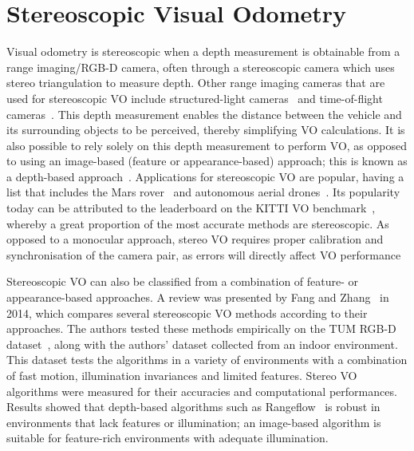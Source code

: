 \section{Stereoscopic Visual Odometry}\label{sec:3:svo}
Visual odometry is stereoscopic when a depth measurement is obtainable from a range imaging/RGB-D camera, often through a stereoscopic camera which uses stereo triangulation to measure depth. Other range imaging cameras that are used for stereoscopic VO include structured-light cameras~\cite{liu_improved_2017,huang_visual_2017} and time-of-flight cameras~\cite{stefan_threedimensional_2009}. This depth measurement enables the distance between the vehicle and its surrounding objects to be perceived, thereby simplifying VO calculations. It is also possible to rely solely on this depth measurement to perform VO, as opposed to using an image-based (feature or appearance-based) approach; this is known as a depth-based approach~\cite{fang_experimental_2015}. Applications for stereoscopic VO are popular, having a list that includes the Mars rover~\cite{maimone_two_2007} and autonomous aerial drones~\cite{strydom_visual_2014}. Its popularity today can be attributed to the leaderboard on the KITTI VO benchmark~\cite{geiger_are_2012}, whereby a great proportion of the most accurate methods are stereoscopic. As opposed to a monocular approach, stereo VO requires proper calibration and synchronisation of the camera pair, as errors will directly affect VO performance~\cite{kitt_visual_2010}


Stereoscopic VO can also be classified from a combination of feature- or appearance-based approaches. A review was presented by Fang and Zhang~\cite{fang_experimental_2015} in 2014, which compares several stereoscopic VO methods according to their approaches. The authors tested these methods empirically on the TUM RGB-D dataset~\cite{sturm_benchmark_2012}, along with the authors' dataset collected from an indoor environment. This dataset tests the algorithms in a variety of environments with a combination of fast motion, illumination invariances and limited features. Stereo VO algorithms were measured for their accuracies and computational performances. Results showed that depth-based algorithms such as Rangeflow~\cite{jaimez_fast_2015} is robust in environments that lack features or illumination; an image-based algorithm is suitable for feature-rich environments with adequate illumination. 

